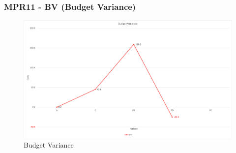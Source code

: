 \subsubsection{MPR11 - BV (Budget Variance)}
\begin{figure}[!ht]
    \caption{Budget Variance}
    \vspace{10px}
    \includegraphics[scale=0.5]{sezioni/immagini/BudgetVariance.png}
    \centering
\end{figure}
\pagebreak
